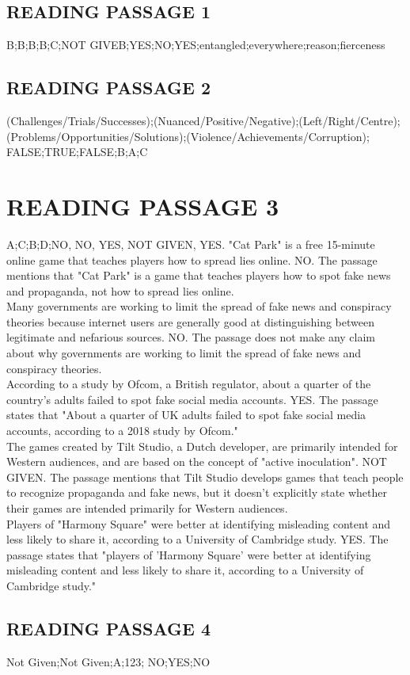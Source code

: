\documentclass[10pt, a4paper, oneside]{article}
\begin{document}
\begin{spacing}{2.0}
\subsection{READING PASSAGE 1}
B;B;B;B;C;NOT GIVEB;YES;NO;YES;entangled;everywhere;reason;fierceness
\subsection{READING PASSAGE 2}
(Challenges/Trials/Successes);(Nuanced/Positive/Negative);(Left/Right/Centre);(Problems/Opportunities/Solutions);(Violence/Achievements/Corruption);
FALSE;TRUE;FALSE;B;A;C
\section{READING PASSAGE 3}
A;C;B;D;NO, NO, YES, NOT GIVEN, YES.
"Cat Park" is a free 15-minute online game that teaches players how to spread lies online.
NO. The passage mentions that "Cat Park" is a game that teaches players how to spot fake news and propaganda, not how to spread lies online.
\\
Many governments are working to limit the spread of fake news and conspiracy theories because internet users are generally good at distinguishing between legitimate and nefarious sources.
NO. The passage does not make any claim about why governments are working to limit the spread of fake news and conspiracy theories.
\\
According to a study by Ofcom, a British regulator, about a quarter of the country's adults failed to spot fake social media accounts.
YES. The passage states that "About a quarter of UK adults failed to spot fake social media accounts, according to a 2018 study by Ofcom."
\\
The games created by Tilt Studio, a Dutch developer, are primarily intended for Western audiences, and are based on the concept of "active inoculation".
NOT GIVEN. The passage mentions that Tilt Studio develops games that teach people to recognize propaganda and fake news, but it doesn't explicitly state whether their games are intended primarily for Western audiences.
\\
Players of "Harmony Square" were better at identifying misleading content and less likely to share it, according to a University of Cambridge study.
YES. The passage states that "players of 'Harmony Square' were better at identifying misleading content and less likely to share it, according to a University of Cambridge study."

\subsection{READING PASSAGE 4}

Not Given;Not Given;A;123;
NO;YES;NO
\end{spacing}{}
\end{document}
